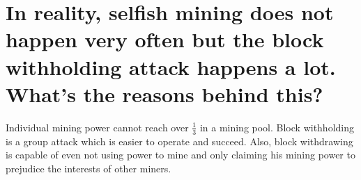 \documentclass{article}
\begin{document}
\section{In reality, selfish mining does not happen very often but the block withholding
attack happens a lot. What’s the reasons behind this?}
Individual mining power cannot reach over $\frac{1}{3}$ in a mining pool.
Block withholding is a group attack which is easier to operate and succeed.
Also, block withdrawing is capable of even not using power to mine 
and only claiming his mining power to prejudice the interests of other miners.
\end{document}
